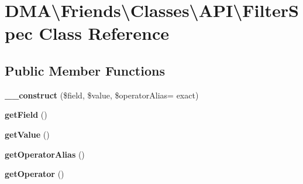 \hypertarget{classDMA_1_1Friends_1_1Classes_1_1API_1_1FilterSpec}{}\section{D\+M\+A\textbackslash{}Friends\textbackslash{}Classes\textbackslash{}A\+P\+I\textbackslash{}Filter\+Spec Class Reference}
\label{classDMA_1_1Friends_1_1Classes_1_1API_1_1FilterSpec}
\subsection*{Public Member Functions}
\begin{DoxyCompactItemize}
\item 
\hypertarget{classDMA_1_1Friends_1_1Classes_1_1API_1_1FilterSpec_af52e5583da6b782c52224e86c2467195}{}{\bfseries \+\_\+\+\_\+construct} (\$field, \$value, \$operator\+Alias= \textquotesingle{}exact\textquotesingle{})\label{classDMA_1_1Friends_1_1Classes_1_1API_1_1FilterSpec_af52e5583da6b782c52224e86c2467195}

\item 
\hypertarget{classDMA_1_1Friends_1_1Classes_1_1API_1_1FilterSpec_a6619fdd4a34efa4f241b2abff9e6a252}{}{\bfseries get\+Field} ()\label{classDMA_1_1Friends_1_1Classes_1_1API_1_1FilterSpec_a6619fdd4a34efa4f241b2abff9e6a252}

\item 
\hypertarget{classDMA_1_1Friends_1_1Classes_1_1API_1_1FilterSpec_ab4990b4455905ff94a18966f6804ee23}{}{\bfseries get\+Value} ()\label{classDMA_1_1Friends_1_1Classes_1_1API_1_1FilterSpec_ab4990b4455905ff94a18966f6804ee23}

\item 
\hypertarget{classDMA_1_1Friends_1_1Classes_1_1API_1_1FilterSpec_a48992101f0a3bf5d5b873db15594d216}{}{\bfseries get\+Operator\+Alias} ()\label{classDMA_1_1Friends_1_1Classes_1_1API_1_1FilterSpec_a48992101f0a3bf5d5b873db15594d216}

\item 
\hypertarget{classDMA_1_1Friends_1_1Classes_1_1API_1_1FilterSpec_a4e447ff725853ae9b9d550bccbcfdf68}{}{\bfseries get\+Operator} ()\label{classDMA_1_1Friends_1_1Classes_1_1API_1_1FilterSpec_a4e447ff725853ae9b9d550bccbcfdf68}

\end{DoxyCompactItemize}
